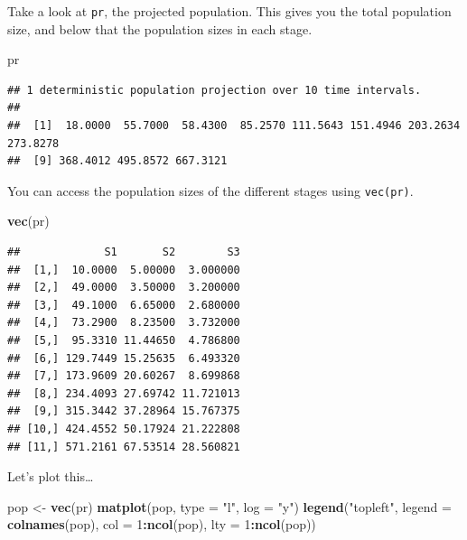 \documentclass[
  a4paper]{book}
\newenvironment{Shaded}{\begin{snugshade}}{\end{snugshade}}
\newcommand{\AttributeTok}[1]{\textcolor[rgb]{0.13,0.29,0.53}{#1}}
\newcommand{\DecValTok}[1]{\textcolor[rgb]{0.00,0.00,0.81}{#1}}
\newcommand{\FunctionTok}[1]{\textcolor[rgb]{0.13,0.29,0.53}{\textbf{#1}}}
\newcommand{\NormalTok}[1]{#1}
\newcommand{\OtherTok}[1]{\textcolor[rgb]{0.56,0.35,0.01}{#1}}
\newcommand{\SpecialCharTok}[1]{\textcolor[rgb]{0.81,0.36,0.00}{\textbf{#1}}}
\newcommand{\StringTok}[1]{\textcolor[rgb]{0.31,0.60,0.02}{#1}}
\begin{document}
Take a look at \texttt{pr}, the projected population. This gives you the total population size, and below that the population sizes in each stage.

\begin{Shaded}
\begin{Highlighting}[]
\NormalTok{pr}
\end{Highlighting}
\end{Shaded}

\begin{verbatim}
## 1 deterministic population projection over 10 time intervals.
## 
##  [1]  18.0000  55.7000  58.4300  85.2570 111.5643 151.4946 203.2634 273.8278
##  [9] 368.4012 495.8572 667.3121
\end{verbatim}

You can access the population sizes of the different stages using \texttt{vec(pr)}.

\begin{Shaded}
\begin{Highlighting}[]
\FunctionTok{vec}\NormalTok{(pr)}
\end{Highlighting}
\end{Shaded}

\begin{verbatim}
##             S1       S2        S3
##  [1,]  10.0000  5.00000  3.000000
##  [2,]  49.0000  3.50000  3.200000
##  [3,]  49.1000  6.65000  2.680000
##  [4,]  73.2900  8.23500  3.732000
##  [5,]  95.3310 11.44650  4.786800
##  [6,] 129.7449 15.25635  6.493320
##  [7,] 173.9609 20.60267  8.699868
##  [8,] 234.4093 27.69742 11.721013
##  [9,] 315.3442 37.28964 15.767375
## [10,] 424.4552 50.17924 21.222808
## [11,] 571.2161 67.53514 28.560821
\end{verbatim}

Let's plot this\ldots{}

\begin{Shaded}
\begin{Highlighting}[]
\NormalTok{pop }\OtherTok{\textless{}{-}} \FunctionTok{vec}\NormalTok{(pr)}
\FunctionTok{matplot}\NormalTok{(pop, }\AttributeTok{type =} \StringTok{"l"}\NormalTok{, }\AttributeTok{log =} \StringTok{"y"}\NormalTok{)}
\FunctionTok{legend}\NormalTok{(}\StringTok{"topleft"}\NormalTok{, }\AttributeTok{legend =} \FunctionTok{colnames}\NormalTok{(pop), }\AttributeTok{col =} \DecValTok{1}\SpecialCharTok{:}\FunctionTok{ncol}\NormalTok{(pop), }\AttributeTok{lty =} \DecValTok{1}\SpecialCharTok{:}\FunctionTok{ncol}\NormalTok{(pop))}
\end{Highlighting}
\end{Shaded}
\end{document}
